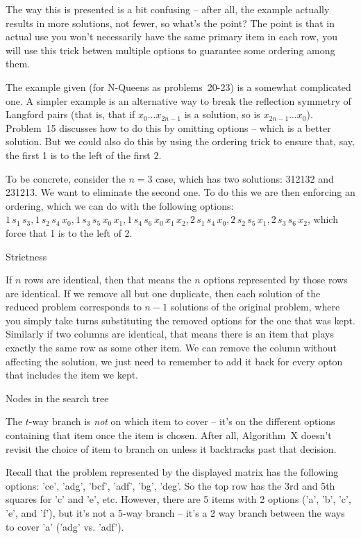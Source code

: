 The way this is presented is a bit confusing -- after all, the example actually
results in more solutions, not fewer, so what's the point?  The point is that
in actual use you won't necessarily have the same primary item in each row, you will use
this trick betwen multiple options to guarantee some ordering among them.

The example given (for N-Queens as problems~20-23) is a somewhat complicated 
one.  A simpler example is an alternative way to break the reflection symmetry
of Langford pairs (that is, that if $x_0 \ldots x_{2n-1}$ is a solution, so
is $x_{2n- 1} \ldots x_{0}$).  Problem~15 discusses how to do this by omitting
options -- which is a better solution.  But we could also do this by using the
ordering trick to ensure that, say, the first 1 is to the left of the first $2$.

To be concrete, consider the $n=3$ case, which has two solutions: 312132 and 
231213.  We want to eliminate the second one.  To do this we are then
enforcing an ordering, which we can do with the following options:
$ 1\,s_1\,s_3, 1\,s_2\,s_4\,x_0, 1\,s_3\,s_5\,x_0\,x_1, 
  1\,s_4\,s_6\,x_0\,x_1\,x_2, 2\,s_1\,s_4\,x_0, 2\,s_2\,s_5\,x_1, 
  2\,s_3\,s_6\,x_2
$, which force that 1 is to the left of 2.


 Strictness

If $n$ rows are identical, then that means the $n$ options represented by those
rows are identical.  If we remove all but one duplicate, then each solution of
the reduced problem corresponds to $n-1$ solutions of the original problem,
where you simply take turns substituting the removed options for the one that
was kept.  Similarly if two columns are identical, that means there is an item
that plays exactly the same row as some other item.  We can remove the column
without affecting the solution, we just need to remember to add it back for
every opton that includes the item we kept.

 Nodes in the search tree

The $t$-way branch is {\it not} on which item to cover -- it's on the different
options containing that item once the item is chosen.  After all, Algorithm~X
doesn't revisit the choice of item to branch on unless it backtracks past that
decision.

Recall that the problem represented by the displayed matrix has the following
options: 'ce', 'adg', 'bcf', 'adf', 'bg', 'deg'.  So the top row has the
3rd and 5th squares for 'c' and 'e', etc.  However, there are 5 items with
2 options ('a', 'b', 'c', 'e', and 'f'), but it's not a 5-way branch -- it's 
a 2 way branch between the ways to cover 'a' ('adg' vs. 'adf').

